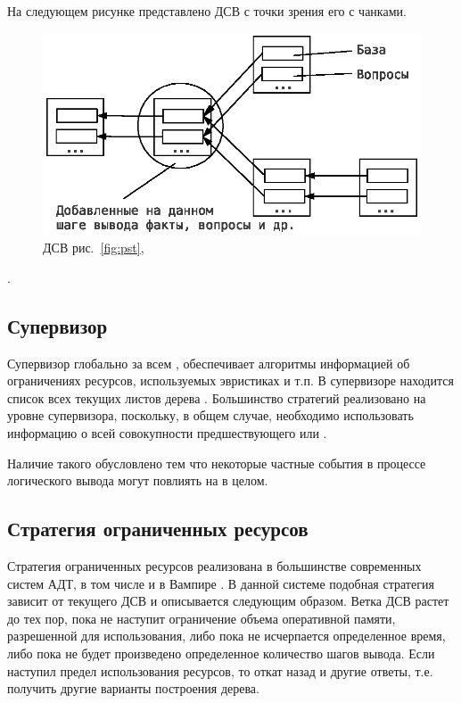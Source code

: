 На следующем рисунке представлено ДСВ с точки зрения его  с чанками.

\begin{figure}[h]
	\centering
	\includegraphics[width=0.6\linewidth]{pics/PST2.eps}
	\caption{ДСВ рис.~\ref{fig:pst}, }
	\label{fig:pst2}
\end{figure}

.


\subsection{Супервизор}
Супервизор  глобально за всем , обеспечивает алгоритмы информацией об ограничениях ресурсов, используемых эвристиках и т.п. В супервизоре находится список всех текущих листов дерева . Большинство стратегий реализовано на уровне супервизора, поскольку, в общем случае, необходимо использовать информацию о всей совокупности предшествующего или .

Наличие такого  обусловлено тем что некоторые частные события в процессе логического вывода могут повлиять на  в целом.

\subsection{Стратегия ограниченных ресурсов}
Стратегия ограниченных ресурсов реализована в большинстве современных систем АДТ, в том числе и в Вампире \cite{}. В данной системе подобная стратегия  зависит от текущего ДСВ и описывается следующим образом. Ветка ДСВ растет до тех пор, пока не наступит ограничение объема оперативной памяти, разрешенной для использования, либо пока не исчерпается определенное время, либо пока не будет произведено определенное количество шагов вывода. Если наступил предел использования ресурсов, то  откат назад и  другие ответы, т.е. получить другие варианты построения дерева.

